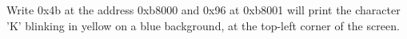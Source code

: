 Write 0x4b at the address 0xb8000 and 0x96 at 0xb8001 will print the
character 'K' blinking in yellow on a blue background, at the top-left corner
of the screen.

%
%









%
%




